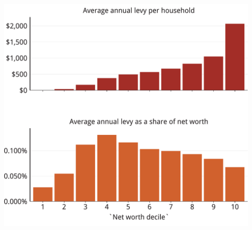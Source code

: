 \documentclass[tikz]{standalone}\usepackage[]{graphicx}\usepackage[]{color}
\newenvironment{knitrout}{}{} %
\begin{document}
\begin{knitrout}
\color{fgcolor}
\includegraphics[width=11.000in,height=10in]{./Property-taxes/atlas/figure/PROP-Figure12-1} 

\end{knitrout}


\end{document}
